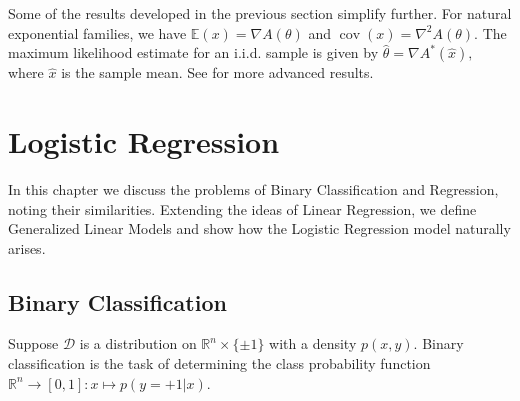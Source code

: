 \documentclass[BSc]{usydthesis}
\numberwithin{equation}{chapter}
\theoremstyle{remark}
\begin{document}
Some of the results developed in the previous section simplify further. For natural exponential families, we have $\mathbb{E}(x) = \nabla A(\theta)$ and $\operatorname{cov}(x) = \nabla^2 A(\theta).$ The maximum likelihood estimate for an i.i.d. sample is given by $ \hat{\theta} = \nabla A^*\left(\hat{x} \right),$ where $\hat{x}$ is the sample mean. See \cite{NEF} for more advanced results.
 
\chapter{Logistic Regression}

In this chapter we discuss the problems of Binary Classification and Regression, noting their similarities. Extending the ideas of Linear Regression, we define Generalized Linear Models and show how the Logistic Regression model naturally arises. 
\section{Binary Classification}
Suppose $\mathcal{D}$ is a distribution on $\mathbb{R}^n  \times \{ \pm 1\}$ with a density $p(x, y).$ Binary classification is the task of determining the class probability function $\mathbb{R}^n \to [0,1] : x \mapsto p(y=+1|x).$
\end{document}
